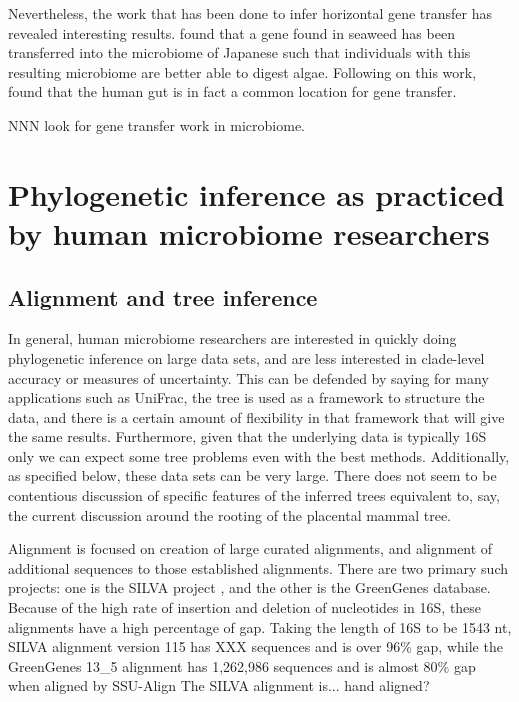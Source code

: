 \documentclass{amsart}
\begin{document}
Nevertheless, the work that has been done to infer horizontal gene transfer has revealed interesting results.
\citet{hehemann2010transfer} found that a gene found in seaweed has been transferred into the microbiome of Japanese such that individuals with this resulting microbiome are better able to digest algae.
Following on this work, \citet{smillie2011ecology} found that the human gut is in fact a common location for gene transfer.

NNN look for gene transfer work in microbiome.


\section{Phylogenetic inference as practiced by human microbiome researchers}

\subsection{Alignment and tree inference}
In general, human microbiome researchers are interested in quickly doing phylogenetic inference on large data sets, and are less interested in clade-level accuracy or measures of uncertainty.
This can be defended by saying for many applications such as UniFrac, the tree is used as a framework to structure the data, and there is a certain amount of flexibility in that framework that will give the same results.
Furthermore, given that the underlying data is typically 16S only we can expect some tree problems even with the best methods.
Additionally, as specified below, these data sets can be very large.
There does not seem to be contentious discussion of specific features of the inferred trees equivalent to, say, the current discussion around the rooting of the placental mammal tree.

Alignment is focused on creation of large curated alignments, and alignment of additional sequences to those established alignments.
There are two primary such projects: one is the SILVA project \citep{pruesse2007silva,quast2013silva}, and the other is the GreenGenes \citep{desantis2006greengenes,mcdonald2011improved} database.
Because of the high rate of insertion and deletion of nucleotides in 16S, these alignments have a high percentage of gap.
Taking the length of 16S to be 1543 nt,
SILVA alignment version 115 has XXX sequences and is over 96\% gap,
while the GreenGenes 13\_5 alignment has 1,262,986 sequences and  is almost 80\% gap when aligned by SSU-Align \cite{nawrocki2009structural}
The SILVA alignment is... hand aligned?
\end{document}
